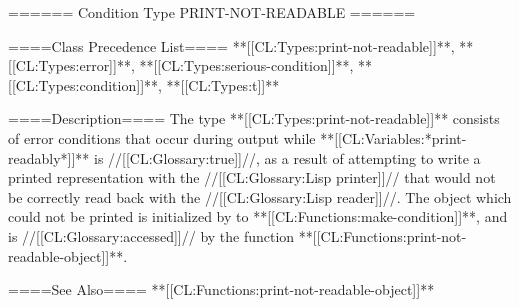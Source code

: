 ====== Condition Type PRINT-NOT-READABLE ======

====Class Precedence List==== **[[CL:Types:print-not-readable]]**, **[[CL:Types:error]]**, **[[CL:Types:serious-condition]]**, **[[CL:Types:condition]]**, **[[CL:Types:t]]**

====Description====
The type **[[CL:Types:print-not-readable]]** consists of error conditions that occur during output while **[[CL:Variables:*print-readably*]]** is //[[CL:Glossary:true]]//, as a result of attempting to write a printed representation with the //[[CL:Glossary:Lisp printer]]// that would not be correctly read back with the //[[CL:Glossary:Lisp reader]]//. The object which could not be printed is initialized by  to **[[CL:Functions:make-condition]]**, and is //[[CL:Glossary:accessed]]// by the function **[[CL:Functions:print-not-readable-object]]**.

====See Also====
**[[CL:Functions:print-not-readable-object]]**

